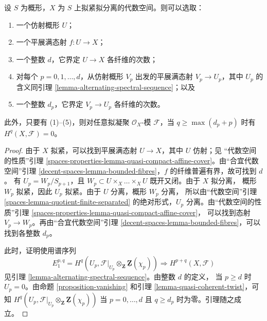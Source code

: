 \begin{lemma}
\label{lemma-vanishing-quasi-separated}
设 $S$ 为概形，$X$ 为 $S$ 上拟紧拟分离的代数空间。则可以选取：
\begin{enumerate}
\item 一个仿射概形 $U$；
\item 一个平展满态射 $f : U \to X$；
\item 一个整数 $d$，它界定 $U \to X$ 各纤维的次数；
\item 对每个 $p = 0, 1, \ldots, d$，从仿射概形 $V_p$ 出发的平展满态射
$V_p \to U_p$，其中 $U_p$ 的含义同引理
\ref{lemma-alternating-spectral-sequence}；以及
\item 一个整数 $d_p$，它界定 $V_p \to U_p$ 各纤维的次数。
\end{enumerate}
此外，只要有 (1)--(5)，则对任意拟凝聚 $\mathcal{O}_X$-模
$\mathcal{F}$，当 $q \geq \max(d_p + p)$ 时有
$H^q(X, \mathcal{F}) = 0$。
\end{lemma}

\begin{proof}
由于 $X$ 拟紧，可以找到平展满态射 $U \to X$，其中 $U$ 仿射；见
“代数空间的性质”引理
\ref{spaces-properties-lemma-quasi-compact-affine-cover}。由“合宜代数空间”引理
\ref{decent-spaces-lemma-bounded-fibres}，$f$ 的纤维普遍有界，故可找到 $d$。
有 $U_p = W_p/S_{p + 1}$，且
$W_p \subset U \times_X \ldots \times_X U$ 既开又闭。由于 $X$ 拟分离，
概形 $W_p$ 拟紧，因此 $U_p$ 拟紧。由于 $U$ 分离，概形 $W_p$ 分离，
所以由“代数空间”引理 \ref{spaces-lemma-quotient-finite-separated}
的绝对形式，$U_p$ 分离。由“代数空间的性质”引理
\ref{spaces-properties-lemma-quasi-compact-affine-cover}，
可以找到态射 $V_p \to W_p$。再由“合宜代数空间”引理
\ref{decent-spaces-lemma-bounded-fibres}，可以找到各整数 $d_p$。

\medskip\noindent
此时，证明使用谱序列
$$
E_1^{p, q} =
H^q(U_p, \mathcal{F}|_{U_p} \otimes_\mathbf{Z} \underline{\mathbf{Z}}(\chi_p))
\Rightarrow
H^{p + q}(X, \mathcal{F})
$$
见引理 \ref{lemma-alternating-spectral-sequence}。由整数 $d$ 的定义，
当 $p \geq d$ 时 $U_p = 0$。由命题 \ref{proposition-vanishing} 和引理
\ref{lemma-quasi-coherent-twist}，可知
$H^q(U_p,
\mathcal{F}|_{U_p} \otimes_\mathbf{Z} \underline{\mathbf{Z}}(\chi_p))$
当 $p = 0, \ldots, d$ 且 $q \geq d_p$ 时为零。引理随之成立。
\end{proof}









